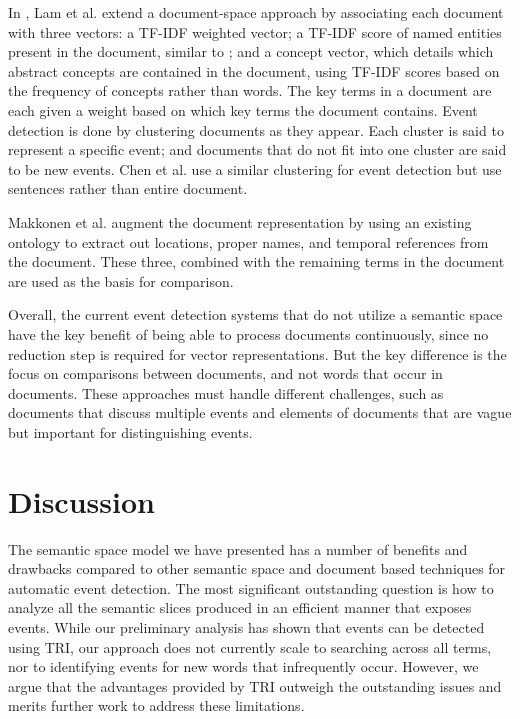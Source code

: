 \documentclass[a4paper,twocolumn,twoside,10pt]{ranlp}
\begin{document}
In \cite{lam01contextual}, Lam et al. extend a document-space approach by
associating each document with three vectors: a TF-IDF weighted vector; a TF-IDF
score of named entities present in the document, similar to
\cite{kumaran04entityevent}; and a concept vector, which details which abstract
concepts are contained in the document, using TF-IDF scores based on the
frequency of concepts rather than words.  The key terms in a document are each
given a weight based on which key terms the document contains.  Event detection
is done by clustering documents as they appear.  Each cluster is said to
represent a specific event; and documents that do not fit into one cluster are
said to be new events.  Chen et al. use a similar clustering for event detection
but use sentences rather than entire document\cite{chen07hot}.

Makkonen et al. augment the document representation by using an existing
ontology to extract out locations, proper names, and temporal references
from the document\cite{makkonen04simple}.  These three, combined
with the remaining terms in the document are used as the basis for comparison.

Overall, the current event detection systems that do not utilize a semantic
space have the key benefit of being able to process documents continuously,
since no reduction step is required for vector representations.  But the key
difference is the focus on comparisons between documents, and not words that
occur in documents.  These approaches must handle different challenges, such as
documents that discuss multiple events and elements of documents that are
vague but important for distinguishing events.

\section{Discussion}

The semantic space model we have presented has a number of benefits and
drawbacks compared to other semantic space and document based techniques for
automatic event detection.  The most significant outstanding question is how to
analyze all the semantic slices produced in an efficient manner that exposes
events.  While our preliminary analysis has shown that events can be detected
using TRI, our approach does not currently scale to searching across all terms,
nor to identifying events for new words that infrequently occur.  However, we
argue that the advantages provided by TRI outweigh the outstanding issues and
merits further work to address these limitations.
\end{document}
